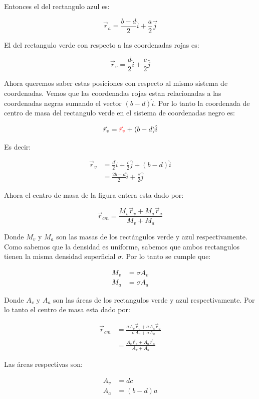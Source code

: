 \documentclass[a4paper,11pt]{article}
\theoremstyle{mytheor}
\begin{document}
Entonces el del rectangulo azul es:

$$ \vec{r}_a = \frac{b-d}{2} \hat{i} + \frac{a}{2} \vec{j}  $$

El del rectangulo verde con respecto a las coordenadas rojas es:

\color{red}

$$ \vec{r}_v = \frac{d}{2} \hat{i} + \frac{c}{2}\hat{j}$$

\color{black}
Ahora queremos saber estas posiciones con respecto al mismo sistema de coordenadas. Vemos que las coordenadas rojas estan relacionadas a las coordenadas negras sumando el vector $(b-d) \hat{i}$. Por lo tanto la coordenada de centro de masa del rectangulo verde en el sistema de coordenadas negro es:

$$ \vec{r}_v = \color{red} \vec{r}_v \color{black}+ (b-d)\hat{i}$$

Es decir:

\begin{align*}
 \vec{r}_v &= \frac{d}{2} \hat{i} + \frac{c}{2}\hat{j} +  (b-d)\hat{i}\\
 &=  \frac{2b-d}{2}\hat{i} + \frac{c}{2}\hat{j} 
\end{align*}


Ahora el centro de masa de la figura entera esta dado por:

$$ \vec{r}_{cm} = \frac{ M_v \vec{r}_v+ M_a \vec{r}_a}{M_v + M_a}$$

Donde $M_v$ y $M_a$ son las masas de los rectángulos verde y azul respectivamente. Como sabemos que la densidad es uniforme, sabemos que ambos rectangulos tienen la misma densidad superficial $\sigma$. Por lo tanto se cumple que:

\begin{align*}
M_v &= \sigma A_v\\
M_a &= \sigma A_a
\end{align*}

Donde $A_v$ y $A_a$ son las áreas de los rectangulos verde y azul respectivamente. Por lo tanto el centro de masa esta dado por:


\begin{align*}
 \vec{r}_{cm} &= \frac{ \sigma A_v \vec{r}_v+ \sigma A_a \vec{r}_a}{\sigma A_v + \sigma A_a} \\
 & = \frac{  A_v \vec{r}_v+  A_a \vec{r}_a}{ A_v +  A_a}
\end{align*}


Las áreas respectivas son:

\begin{align*}
A_v & = dc\\
A_a & = (b-d)a
\end{align*}
\end{document}
